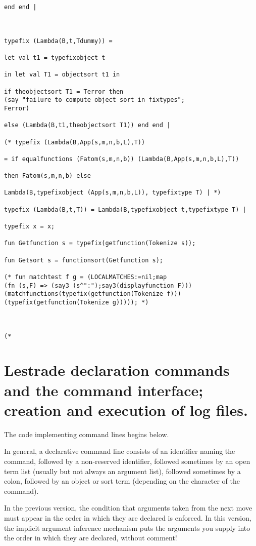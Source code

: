 \documentclass[12pt]{article}
\begin{document}
\begin{verbatim}
end end |



typefix (Lambda(B,t,Tdummy)) = 

let val t1 = typefixobject t

in let val T1 = objectsort t1 in 

if theobjectsort T1 = Terror then 
(say "failure to compute object sort in fixtypes";
Ferror)

else (Lambda(B,t1,theobjectsort T1)) end end |

(* typefix (Lambda(B,App(s,m,n,b,L),T))

= if equalfunctions (Fatom(s,m,n,b)) (Lambda(B,App(s,m,n,b,L),T)) 

then Fatom(s,m,n,b) else 

Lambda(B,typefixobject (App(s,m,n,b,L)), typefixtype T) | *)

typefix (Lambda(B,t,T)) = Lambda(B,typefixobject t,typefixtype T) |

typefix x = x;

fun Getfunction s = typefix(getfunction(Tokenize s));

fun Getsort s = functionsort(Getfunction s);

(* fun matchtest f g = (LOCALMATCHES:=nil;map
(fn (s,F) => (say3 (s^":");say3(displayfunction F)))
(matchfunctions(typefix(getfunction(Tokenize f))) 
(typefix(getfunction(Tokenize g))))); *)



(*

\end{verbatim}

\newpage

\section{Lestrade declaration commands and the command interface; creation and execution of log files.}

The code implementing command lines begins below.

In general, a declarative command line consists of an identifier naming the command, followed by a non-reserved identifier, followed sometimes by an open term list (usually but not always an argument list), followed sometimes by a colon, followed by an object or sort term (depending on the character of the command).

In the previous version, the condition that arguments taken from the next move must appear in the order in which they are declared is enforced.
In this version, the implicit argument inference mechanism puts the arguments you supply into the order in which they are declared, without comment!
\end{document}
